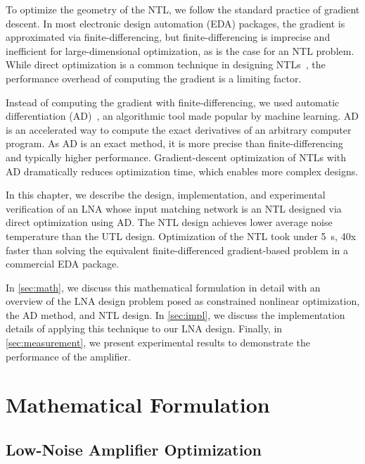 To optimize the geometry of the NTL, we follow the standard practice of gradient descent.
In most electronic design automation (EDA) packages, the gradient is approximated via finite-differencing, but finite-differencing is imprecise and inefficient for large-dimensional optimization, as is the case for an NTL problem.
While direct optimization is a common technique in designing NTLs~\cite{miazgaNonuniformTransmissionLine2014, miazgaDiscreteShapeOptimization2008, schaepperleOptimizationDistributedParameter1994}, the performance overhead of computing the gradient is a limiting factor.

Instead of computing the gradient with finite-differencing, we used automatic differentiation (AD)~\cite{baydinAutomaticDifferentiationMachine2017}, an algorithmic tool made popular by machine learning.
AD is an accelerated way to compute the exact derivatives of an arbitrary computer program.
As AD is an exact method, it is more precise than finite-differencing and typically higher performance.
Gradient-descent optimization of NTLs with AD dramatically reduces optimization time, which enables more complex designs.

In this chapter, we describe the design, implementation, and experimental verification of an LNA whose input matching network is an NTL designed via direct optimization using AD.
The NTL design achieves lower average noise temperature than the UTL design.
Optimization of the NTL took under \qty{5}{\s}, \num{40}x faster than solving the equivalent finite-differenced gradient-based problem in a commercial EDA package.

In \autoref{sec:math}, we discuss this mathematical formulation in detail with an overview of the LNA design problem posed as constrained nonlinear optimization, the AD method, and NTL design.
In \autoref{sec:impl}, we discuss the implementation details of applying this technique to our LNA design.
Finally, in \autoref{sec:measurement}, we present experimental results to demonstrate the performance of the amplifier.

\section{Mathematical Formulation} \label{sec:math}

\subsection{Low-Noise Amplifier Optimization}

